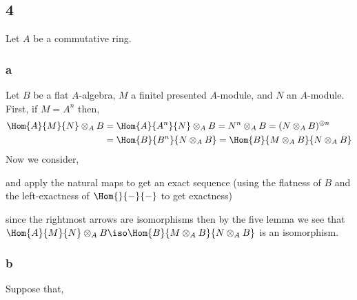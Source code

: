 \documentclass[12pt]{article}
\begin{document}
\subsection{4}

Let $A$ be a commutative ring. 

\subsubsection{a}

Let $B$ be a flat $A$-algebra, $M$ a finitel presented $A$-module, and $N$ an $A$-module. First, if $M = A^n$ then,
\begin{align*}
\Hom{A}{M}{N} \otimes_A B & = \Hom{A}{A^n}{N} \otimes_A B = N^n \otimes_A B = (N \otimes_A B)^{\oplus n} 
\\
& = \Hom{B}{B^n}{N \otimes_A B} = \Hom{B}{M \otimes_A B}{N \otimes_A B} 
\end{align*}
Now we consider,
\begin{center}
\end{center}
and apply the natural maps to get an exact sequence (using the flatness of $B$ and the left-exactness of $\Hom{}{-}{-}$ to get exactness)
\begin{center}
\end{center}
since the rightmost arrows are isomorphisms then by the five lemma we see that $\Hom{A}{M}{N} \otimes_A B \iso \Hom{B}{M \otimes_A B}{N \otimes_A B}$ is an isomorphism.

\subsubsection{b}

Suppose that,
\end{document}
